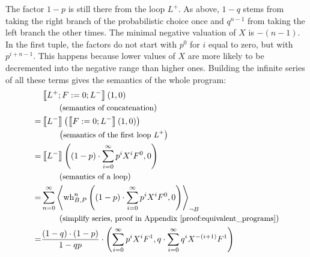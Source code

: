 The factor $1-p$ is still there from the loop $L^+$.
As above, $1-q$ stems from taking the right branch of the probabilistic choice once and $q^{n-1}$ from taking the left branch the other times.
The minimal negative valuation of $X$ is $-(n-1)$.
In the first tuple, the factors do not start with $p^0$ for $i$ equal to zero, but with $p^{i+n-1}$.
This happens because lower values of $X$ are more likely to be decremented into the negative range than higher ones.
Building the infinite series of all these terms gives the semantics of the whole program:
\begin{align*}
	 & \left\llbracket L^+; F := 0; L^- \right\rrbracket\left( 1, 0 \right) \\
	 & \hspace*{2em} \left(\text{\small semantics of concatenation}\right) \\
	=& \left\llbracket L^- \right\rrbracket\left( \left\llbracket F := 0; L^- \right\rrbracket(1, 0) \right) \\
	 & \hspace*{2em} \left(\text{\small semantics of the first loop $L^+$}\right) \\
	=& \left\llbracket L^- \right\rrbracket\left(  (1-p) \cdot \sum_{i = 0}^{\infty} p^i X^i F^0 , 0 \right) \\
	 & \hspace*{2em} \left(\text{\small semantics of a loop}\right) \\
	=& \sum_{n=0}^{\infty} \left\langle  \operatorname{wh}_{B, P}^n
		\left(  (1-p) \cdot \sum_{i = 0}^{\infty} p^i X^i F^0 , 0 \right)  \right\rangle_{\lnot B} \\
	 & \hspace*{2em} \left(\text{\small simplify series, proof in Appendix \ref{proof:equivalent_programs}}\right) \\
	=& \frac{(1-q) \cdot (1-p)}{1-qp} \cdot
		\left(  \sum_{i=0}^{\infty} p^i X^i F^1,
			q \cdot \sum_{i=0}^{\infty} q^i X^{-(i+1)} F^1 \right) \\
\end{align*}

